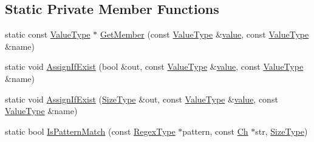 \subsection*{Static Private Member Functions}
\begin{DoxyCompactItemize}
\item 
static const \mbox{\hyperlink{classrapidjson_1_1internal_1_1_schema_a3979a9083c598195927c08c6e3ba91d1}{Value\+Type}} $\ast$ \mbox{\hyperlink{classrapidjson_1_1internal_1_1_schema_ace892ab57c0cb2c4a75d84b36c56cd66}{Get\+Member}} (const \mbox{\hyperlink{classrapidjson_1_1internal_1_1_schema_a3979a9083c598195927c08c6e3ba91d1}{Value\+Type}} \&\mbox{\hyperlink{namespacerapidjson_a1a75d60792094d496b500c40776030dd}{value}}, const \mbox{\hyperlink{classrapidjson_1_1internal_1_1_schema_a3979a9083c598195927c08c6e3ba91d1}{Value\+Type}} \&name)
\item 
static void \mbox{\hyperlink{classrapidjson_1_1internal_1_1_schema_a5aef16ffcea6b5fe6f74420a84100ff5}{Assign\+If\+Exist}} (bool \&out, const \mbox{\hyperlink{classrapidjson_1_1internal_1_1_schema_a3979a9083c598195927c08c6e3ba91d1}{Value\+Type}} \&\mbox{\hyperlink{namespacerapidjson_a1a75d60792094d496b500c40776030dd}{value}}, const \mbox{\hyperlink{classrapidjson_1_1internal_1_1_schema_a3979a9083c598195927c08c6e3ba91d1}{Value\+Type}} \&name)
\item 
static void \mbox{\hyperlink{classrapidjson_1_1internal_1_1_schema_a41c8d2a1acbae618e9ec1a95be14c32b}{Assign\+If\+Exist}} (\mbox{\hyperlink{namespacerapidjson_a44eb33eaa523e36d466b1ced64b85c84}{Size\+Type}} \&out, const \mbox{\hyperlink{classrapidjson_1_1internal_1_1_schema_a3979a9083c598195927c08c6e3ba91d1}{Value\+Type}} \&\mbox{\hyperlink{namespacerapidjson_a1a75d60792094d496b500c40776030dd}{value}}, const \mbox{\hyperlink{classrapidjson_1_1internal_1_1_schema_a3979a9083c598195927c08c6e3ba91d1}{Value\+Type}} \&name)
\item 
static bool \mbox{\hyperlink{classrapidjson_1_1internal_1_1_schema_a3cccb6849671ddd73aa8225425323091}{Is\+Pattern\+Match}} (const \mbox{\hyperlink{classrapidjson_1_1internal_1_1_schema_a2c16b06523df78f5c354e9a68da90e23}{Regex\+Type}} $\ast$pattern, const \mbox{\hyperlink{classrapidjson_1_1internal_1_1_schema_ab9093cbc42067b8e1d3745eafe096ab3}{Ch}} $\ast$str, \mbox{\hyperlink{namespacerapidjson_a44eb33eaa523e36d466b1ced64b85c84}{Size\+Type}})
\end{DoxyCompactItemize}
